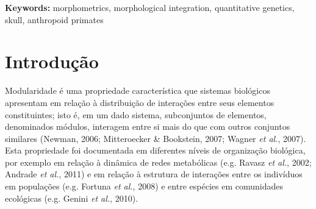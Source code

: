 \documentclass[12pt,twoside]{report}
\renewcommand{\headrulewidth}{0pt}%
\begin{document}
\noindent
\par
\vspace{1em}
\noindent\textbf{Keywords:} morphometrics, morphological integration, quantitative genetics, skull, anthropoid primates


\newpage

\tableofcontents
{\footnotesize \listoffigures}
\listoftables

\newpage


\def\sectionautorefname{Seção}
\def\chapterautorefname{Capítulo}
\def\figureautorefname{Figura}
\def\tableautorefname{Tabela}

\onehalfspacing

\pagestyle{fancy}

\renewcommand{\chaptermark}[1]{\markboth{#1}{}}
\renewcommand{\sectionmark}[1]{\markright{#1}{}}

\fancyhf{} \fancyhead[RO]{\itshape \leftmark}
\fancyhead[LE]{\itshape \rightmark} \fancyfoot[RO,LE]{\thepage}
\renewcommand{\headrulewidth}{0.5pt} \renewcommand{\footrulewidth}{0pt}

\linenumbers
\modulolinenumbers[5]

\newpage
\chapter{Introdução}
\label{ch:intro}

Modularidade é uma propriedade característica que sistemas biológicos
apresentam em relação à distribuição de interações entre seus elementos
constituintes; isto é, em um dado sistema, subconjuntos de elementos,
denominados módulos, interagem entre si mais do que com outros conjuntos
similares (Newman, 2006; Mitteroecker \& Bookstein, 2007; Wagner
\emph{et al.}, 2007). Esta propriedade foi documentada em diferentes
níveis de organização biológica, por exemplo em relação à dinâmica de
redes metabólicas (e.g. Ravasz \emph{et al.}, 2002; Andrade \emph{et
al.}, 2011) e em relação à estrutura de interações entre os indivíduos
em populações (e.g. Fortuna \emph{et al.}, 2008) e entre espécies em
comunidades ecológicas (e.g. Genini \emph{et al.}, 2010).
\end{document}
